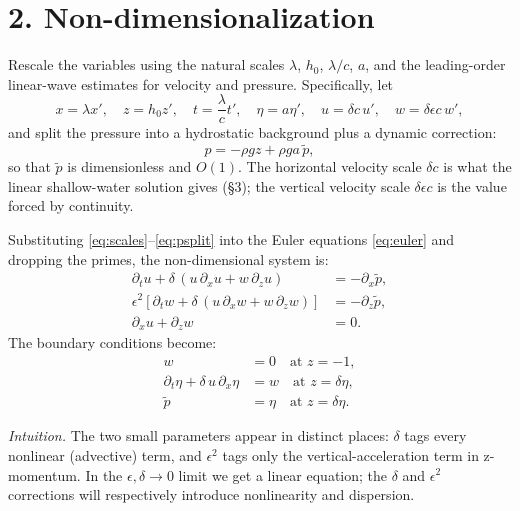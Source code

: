 \documentclass{article}
\begin{document}
\section*{2. Non-dimensionalization}

Rescale the variables using the natural scales \(\lambda\), \(h_0\), \(\lambda/c\), \(a\), and the leading-order linear-wave estimates for velocity and pressure. Specifically, let
\begin{equation}
x = \lambda x', \quad z = h_0 z', \quad t = \frac{\lambda}{c} t', \quad
\eta = a \eta', \quad
u = \delta c\, u', \quad
w = \delta \epsilon c\, w',
\label{eq:scales}
\end{equation}
and split the pressure into a hydrostatic background plus a dynamic correction:
\begin{equation}
p = -\rho g z + \rho g a\, \tilde p,
\label{eq:psplit}
\end{equation}
so that \(\tilde p\) is dimensionless and \(O(1)\). The horizontal velocity scale \(\delta c\) is what the linear shallow-water solution gives (\S 3); the vertical velocity scale \(\delta \epsilon c\) is the value forced by continuity.

Substituting \eqref{eq:scales}--\eqref{eq:psplit} into the Euler equations \eqref{eq:euler} and dropping the primes, the non-dimensional system is:
\begin{subequations}
\label{eq:nondim}
\begin{align}
\partial_t u + \delta\, (u\, \partial_x u + w\, \partial_z u) &= -\partial_x \tilde p, \label{eq:nondim-x} \\
\epsilon^2\!\left[\partial_t w + \delta\, (u\, \partial_x w + w\, \partial_z w)\right] &= -\partial_z \tilde p, \label{eq:nondim-z} \\
\partial_x u + \partial_z w &= 0. \label{eq:nondim-cont}
\end{align}
\end{subequations}
The boundary conditions become:
\begin{align}
w &= 0 \quad \text{at } z = -1, \label{eq:nd-bed} \\
\partial_t \eta + \delta\, u\, \partial_x \eta &= w \quad \text{at } z = \delta \eta, \label{eq:nd-kin} \\
\tilde p &= \eta \quad \text{at } z = \delta \eta. \label{eq:nd-dyn}
\end{align}

\noindent\emph{Intuition.} The two small parameters appear in distinct places: \(\delta\) tags every nonlinear (advective) term, and \(\epsilon^2\) tags only the vertical-acceleration term in z-momentum. In the \(\epsilon, \delta \to 0\) limit we get a linear equation; the \(\delta\) and \(\epsilon^2\) corrections will respectively introduce nonlinearity and dispersion.
\end{document}
